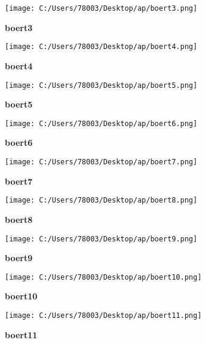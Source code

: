 \documentclass[UTF8]{report}
\theoremstyle{MyLineTheoremStyle} %
\theoremstyle{MyBlockTheoremStyle} %
\theoremstyle{MySubsubsectionStyle} %
\begin{document}
\begin{figure}[ht]
    \centering
    \texttt{[image: C:/Users/78003/Desktop/ap/boert3.png]}
    \caption{\textbf{boert3}}
    \label{fig:boert3}
\end{figure}

\begin{figure}[ht]
    \centering
    \texttt{[image: C:/Users/78003/Desktop/ap/boert4.png]}
    \caption{\textbf{boert4}}
    \label{fig:boert4}
\end{figure}

\begin{figure}[ht]
    \centering
    \texttt{[image: C:/Users/78003/Desktop/ap/boert5.png]}
    \caption{\textbf{boert5}}
    \label{fig:boert5}
\end{figure}

\begin{figure}[ht]
    \centering
    \texttt{[image: C:/Users/78003/Desktop/ap/boert6.png]}
    \caption{\textbf{boert6}}
    \label{fig:boert6}
\end{figure}

\begin{figure}[ht]
    \centering
    \texttt{[image: C:/Users/78003/Desktop/ap/boert7.png]}
    \caption{\textbf{boert7}}
    \label{fig:boert7}
\end{figure}

\begin{figure}[ht]
    \centering
    \texttt{[image: C:/Users/78003/Desktop/ap/boert8.png]}
    \caption{\textbf{boert8}}
    \label{fig:boert8}
\end{figure}

\begin{figure}[ht]
    \centering
    \texttt{[image: C:/Users/78003/Desktop/ap/boert9.png]}
    \caption{\textbf{boert9}}
    \label{fig:boert9}
\end{figure}

\begin{figure}[ht]
    \centering
    \texttt{[image: C:/Users/78003/Desktop/ap/boert10.png]}
    \caption{\textbf{boert10}}
    \label{fig:boert10}
\end{figure}

\begin{figure}[ht]
    \centering
    \texttt{[image: C:/Users/78003/Desktop/ap/boert11.png]}
    \caption{\textbf{boert11}}
    \label{fig:boert11}
\end{figure}
\end{document}
